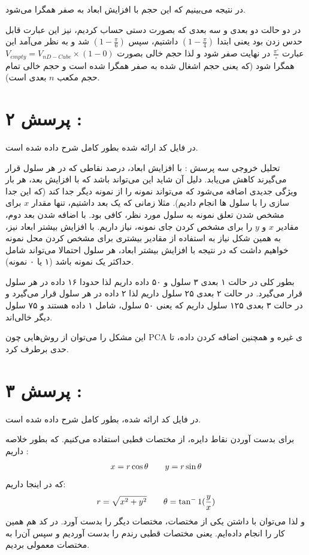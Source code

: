 \documentclass[a4paper, 12pt]{article}
\begin{document}
در نتیجه می‌بینیم که این حجم با افزایش ابعاد به صفر همگرا می‌شود.

در دو حالت دو بعدی و سه بعدی که بصورت دستی حساب کردیم، نیز این عبارت قابل حدس زدن بود یعنی ابتدا 
$(1 - \frac{\pi}{4})$
داشتیم، سپس 
$(1 - \frac{\pi}{6})$
شد و به نظر می‌آمد این عبارت 
$\frac{\pi^\square}{\square}$
در نهایت صفر شود و لذا حجم خالی بصورت 
\linebreak
$V_{empty} = V_{nD-Cube} \times (1 - 0) $
همگرا شود (که یعنی حجم اشغال شده به صفر همگرا شده است و حجم خالی تمام حجم مکعب $n$ بعدی است).


\section*{پرسش ۲ :}

در فایل کد ارائه شده بطور کامل شرح داده شده است.

تحلیل خروجی سه پرسش : با افزایش ابعاد، درصد نقاطی که در هر سلول قرار می‌گیرند کاهش می‌یابد. دلیل آن شاید این می‌تواند باشد که با افزایش بعد، هر بار ویژگی جدیدی اضافه می‌شود که می‌تواند نمونه را از نمونه دیگر جدا کند (که این جدا سازی را با سلول ها انجام دادیم). مثلا زمانی که یک بعد داشتیم، تنها مقدار 
$x$
برای مشخص شدن تعلق نمونه به سلول مورد نظر، کافی بود. با اضافه شدن بعد دوم، مقادیر 
$x$
و
$y$
را برای مشخص کردن جای نمونه، نیاز داریم. با افزایش بیشتر ابعاد نیز، به همین شکل نیاز به استفاده از مقادیر بیشتری برای مشخص کردن محل نمونه خواهیم داشت که در نتیجه  با افزایش بیشتر ابعاد، هر سلول احتمالا می‌تواند شامل حداکثر یک نمونه باشد (۱ یا ۰ نمونه). 

بطور کلی در حالت ۱ بعدی ۳ سلول و ۵۰ داده داریم لذا حدودا ۱۶ داده در هر سلول قرار می‌گیرد. در حالت ۲ بعدی ۲۵ سلول داریم لذا ۲ داده در هر سلول قرار می‌گیرد و در حالت ۳ بعدی ۱۲۵ سلول داریم که یعنی ۵۰ سلول، شامل ۱ داده هستند و ۷۵ سلول دیگر خالی‌اند. 

این مشکل را می‌توان از روش‌هایی چون 
PCA
ی غیره و همچنین اضافه کردن داده، تا حدی برطرف کرد.  

\section*{پرسش ۳ : }

در فایل کد ارائه شده، بطور کامل شرح داده شده است.

برای بدست آوردن نقاط دایره، از مختصات قطبی استفاده می‌کنیم. که بطور خلاصه داریم :
\begin{align*}
	x  = r\cos\theta \hspace{7mm} y = r\sin\theta
\end{align*}
که در اینجا داریم:
\begin{align*}
	r = \sqrt{x^2 + y^2} \hspace{7mm} \theta = \tan^-1(\frac{y}{x})
\end{align*}
 و لذا می‌توان با داشتن یکی از مختصات، مختصات دیگر را بدست  آورد. در کد هم همین کار را انجام داده‌ایم. یعنی مختصات قطبی رندم را بدست آوردیم و سپس آن‌را به مختصات معمولی بردیم.
 
\end{document}
